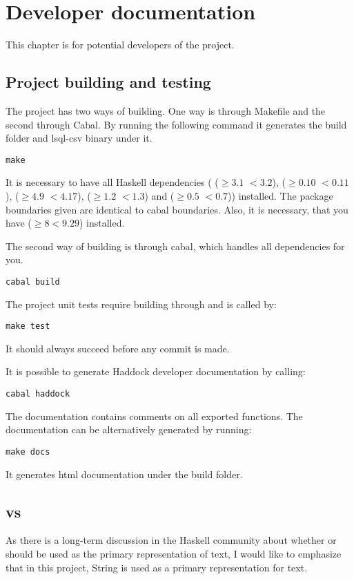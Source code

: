 \chapter{Developer documentation}
This chapter is for potential developers of the project.

\section{Project building and testing}
The project has two ways of building. One way is through Makefile and the second through Cabal. 
By running the following command it generates the build folder and lsql-csv binary under it.
\begin{verbatim}
make
\end{verbatim}
 
It is necessary to have all Haskell dependencies ( ($\geq 3.1$ $<3.2$),  ($\geq 0.10$ $<0.11$), 
 ($\geq 4.9$ $<4.17$),  ($\geq 1.2$ $<1.3$) and  ($\geq 0.5$ $<0.7$)) installed.
The package boundaries given are identical to cabal boundaries. Also, it is necessary, that you have  ($\geq 8 <9.29$) installed.

The second way of building is through cabal, which handles all dependencies for you.

\begin{verbatim}
cabal build
\end{verbatim}


The project unit tests require building through  and is called by:
\begin{verbatim}
make test
\end{verbatim}
It should always succeed before any commit is made.

It is possible to generate Haddock developer documentation by calling:
\begin{verbatim}
cabal haddock
\end{verbatim}

The documentation contains comments on all exported functions. The documentation can be alternatively generated
by running:

\begin{verbatim}
make docs
\end{verbatim}
It generates html documentation under the build folder.

\section{ vs }
As there is a long-term discussion in the Haskell community about whether  or  should be used as the 
primary representation of text, I would like to emphasize that in this project, String is used as a primary
representation for text.

